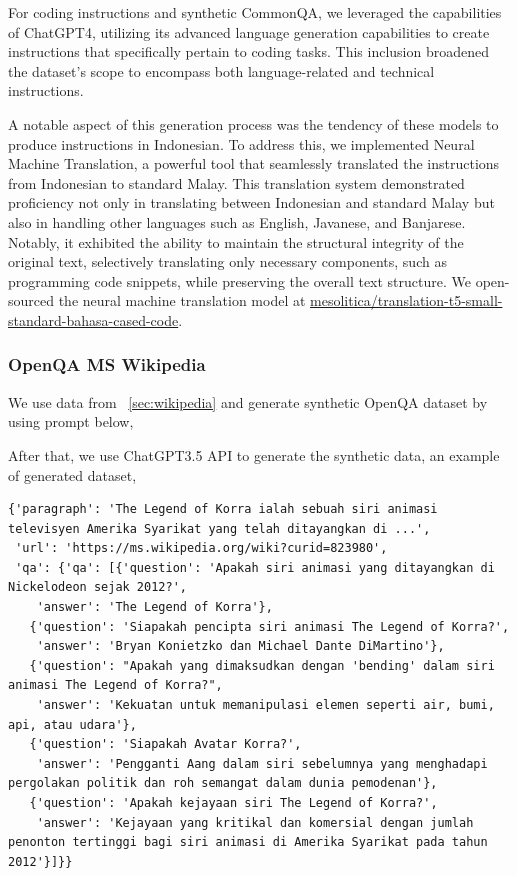 \documentclass[preprint]{article}
\begin{document}
For coding instructions and synthetic CommonQA, we leveraged the capabilities of ChatGPT4, utilizing its advanced language generation capabilities to create instructions that specifically pertain to coding tasks. This inclusion broadened the dataset's scope to encompass both language-related and technical instructions.

A notable aspect of this generation process was the tendency of these models to produce instructions in Indonesian. To address this, we implemented Neural Machine Translation, a powerful tool that seamlessly translated the instructions from Indonesian to standard Malay. This translation system demonstrated proficiency not only in translating between Indonesian and standard Malay but also in handling other languages such as English, Javanese, and Banjarese. Notably, it exhibited the ability to maintain the structural integrity of the original text, selectively translating only necessary components, such as programming code snippets, while preserving the overall text structure. We open-sourced the neural machine translation model at \href{https://huggingface.co/mesolitica/translation-t5-small-standard-bahasa-cased-code}{mesolitica/translation-t5-small-standard-bahasa-cased-code}.

\subsubsection{OpenQA MS Wikipedia}

We use data from ~\ref{sec:wikipedia} and generate synthetic OpenQA dataset by using prompt below,

After that, we use ChatGPT3.5 API to generate the synthetic data, an example of generated dataset,

\begin{lstlisting}[]
  {'paragraph': 'The Legend of Korra ialah sebuah siri animasi televisyen Amerika Syarikat yang telah ditayangkan di ...',
 'url': 'https://ms.wikipedia.org/wiki?curid=823980',
 'qa': {'qa': [{'question': 'Apakah siri animasi yang ditayangkan di Nickelodeon sejak 2012?',
    'answer': 'The Legend of Korra'},
   {'question': 'Siapakah pencipta siri animasi The Legend of Korra?',
    'answer': 'Bryan Konietzko dan Michael Dante DiMartino'},
   {'question': "Apakah yang dimaksudkan dengan 'bending' dalam siri animasi The Legend of Korra?",
    'answer': 'Kekuatan untuk memanipulasi elemen seperti air, bumi, api, atau udara'},
   {'question': 'Siapakah Avatar Korra?',
    'answer': 'Pengganti Aang dalam siri sebelumnya yang menghadapi pergolakan politik dan roh semangat dalam dunia pemodenan'},
   {'question': 'Apakah kejayaan siri The Legend of Korra?',
    'answer': 'Kejayaan yang kritikal dan komersial dengan jumlah penonton tertinggi bagi siri animasi di Amerika Syarikat pada tahun 2012'}]}}
    
\end{lstlisting}
\end{document}
